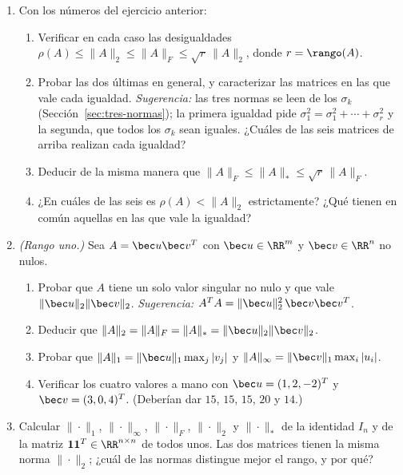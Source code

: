 \begin{enumerate}
\item\label{ej-orden-normas} Con los números del ejercicio anterior:
\begin{enumerate}[label=\textup{(\alph*)}]
\item Verificar en cada caso las desigualdades
$\rho(A)\le\|A\|_2\le\|A\|_F\le\sqrt r\,\|A\|_2$, donde $r=\rango(A)$.
\item Probar las dos últimas en general, y caracterizar las matrices en las
que vale cada igualdad. \emph{Sugerencia:} las tres normas se leen de los
$\sigma_k$ (Sección~\ref{sec:tres-normas}); la primera igualdad pide
$\sigma_1^2=\sigma_1^2+\cdots+\sigma_r^2$ y la segunda, que todos los
$\sigma_k$ sean iguales. ¿Cuáles de las seis matrices de arriba realizan cada
igualdad?
\item Deducir de la misma manera que $\|A\|_F\le\|A\|_*\le\sqrt r\,\|A\|_F$.
\item ¿En cuáles de las seis es $\rho(A)<\|A\|_2$ estrictamente? ¿Qué tienen
en común aquellas en las que vale la igualdad?
\end{enumerate}

\item\label{ej-rango-uno-normas} \emph{(Rango uno.)} Sea $A=\bec u\bec v^T$
con $\bec u\in\RR^m$ y $\bec v\in\RR^n$ no nulos.
\begin{enumerate}[label=\textup{(\alph*)}]
\item Probar que $A$ tiene un solo valor singular no nulo y que vale
$\|\bec u\|_2\|\bec v\|_2$. \emph{Sugerencia:} $A^TA=\|\bec u\|_2^2\,\bec v\bec v^T$.
\item Deducir que $\|A\|_2=\|A\|_F=\|A\|_*=\|\bec u\|_2\|\bec v\|_2$.
\item Probar que $\|A\|_1=\|\bec u\|_1\max_j|v_j|$ y
$\|A\|_\infty=\|\bec v\|_1\max_i|u_i|$.
\item Verificar los cuatro valores a mano con $\bec u=(1,2,-2)^T$ y
$\bec v=(3,0,4)^T$. (Deberían dar $15$, $15$, $15$, $20$ y $14$.)
\end{enumerate}

\item\label{ej-identidad-unos} Calcular $\|\cdot\|_1$, $\|\cdot\|_\infty$,
$\|\cdot\|_F$, $\|\cdot\|_2$ y $\|\cdot\|_*$ de la identidad $I_n$ y de la
matriz $\mathbf 1\mathbf 1^T\in\RR^{n\times n}$ de todos unos. Las dos
matrices tienen la misma norma $\|\cdot\|_2$; ¿cuál de las normas distingue
mejor el rango, y por qué?


\end{enumerate}
